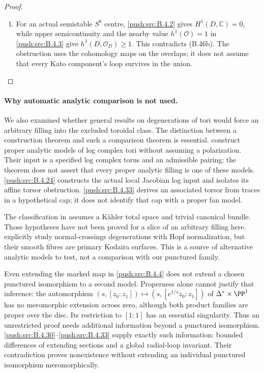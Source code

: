 \begin{proof}
\begin{enumerate}[label=\arabic*.,leftmargin=*]
\item For an actual semistable $S^6$ centre, \ref{push:src:B.4.2} gives
$H^1(D,\mathbb C)=0$, while upper semicontinuity
and the nearby value $h^1(\mathcal O)=1$ in \ref{push:src:B.4.3}
give $h^1(D,\mathcal O_D)\geq1$. This contradicts
(B.46b). The obstruction uses the cohomology maps
on the overlaps; it does not assume that every
Kato component's loop survives in the union.
\end{enumerate}
\end{proof}


\paragraph{Why automatic analytic comparison is not used.}
We also examined whether general results on degenerations of tori
would force an arbitrary filling into the excluded toroidal class.
The distinction between a construction theorem and such a comparison
theorem is essential. \citet[Theorem 5.1.3 and Sections 5.2--5.4]
{KKN2008Root} construct proper analytic models of log complex tori
without assuming a polarization. Their input is a specified log
complex torus and an admissible pairing; the theorem does not assert
that every proper analytic filling is one of these models.
\ref{push:src:B.4.24} constructs the actual local Jacobian log input and isolates
its affine torsor obstruction. \ref{push:src:B.4.33} derives an associated torsor
from traces in a hypothetical cap; it does not identify that cap
with a proper fan model.

The classification in \citet[Theorem 3.1]{KamenovaToriRoot} assumes
a K\"ahler total space and trivial canonical bundle. Those hypotheses
have not been proved for a slice of an arbitrary filling here.
\citet[Proposition 3.1, preprint pp.~6--7]{SchroeerSiebert2002Root} explicitly
study normal-crossings degenerations with Hopf normalization, but
their smooth fibres are primary Kodaira surfaces. This is a source
of alternative analytic models to test, not a comparison with our
punctured family.

Even extending the marked map in \ref{push:src:B.4.4} does not extend a chosen
punctured isomorphism to a second model. Properness alone cannot
justify that inference: the automorphism
$(s,[z_0:z_1])\mapsto(s,[e^{1/s}z_0:z_1])$ of
$\Delta^*\times\PP^1$ has no meromorphic extension across zero,
although both product families are proper over the disc. Its
restriction to $[1:1]$ has an essential singularity. Thus an
unrestricted proof needs additional information beyond a
punctured isomorphism. \ref{push:src:B.4.30}--\ref{push:src:B.4.33} supply exactly such information:
bounded differences of extending sections and a global radial-loop
invariant. Their contradiction proves nonexistence without extending
an individual punctured isomorphism meromorphically.



